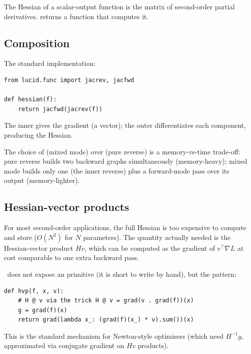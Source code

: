 The Hessian of a scalar-output function is the matrix of
second-order partial derivatives.  returns a
function that computes it.

\subsection{Composition}
\label{ssec:higher_order:hessian_composition}

The standard implementation:

\begin{lstlisting}[style=lucid,language=LucidPython]
from lucid.func import jacrev, jacfwd

def hessian(f):
    return jacfwd(jacrev(f))
\end{lstlisting}

The inner  gives the gradient (a vector); the outer
 differentiates each component, producing the
Hessian.

The choice of  (mixed mode) over
 (pure reverse) is a memory-vs-time
trade-off: pure reverse builds two backward graphs simultaneously
(memory-heavy); mixed mode builds only one (the inner reverse)
plus a forward-mode pass over its output (memory-lighter).

\subsection{Hessian-vector products}
\label{ssec:higher_order:hvp}

For most second-order applications, the full Hessian is too
expensive to compute and store ($O(N^2)$ for $N$ parameters). The
quantity actually needed is the Hessian-vector product
$H v$, which can be computed as the gradient of $v^\top \nabla L$
at cost comparable to one extra backward pass.

\Lucid\ does not expose an  primitive (it is short to
write by hand), but the pattern:

\begin{lstlisting}[style=lucid,language=LucidPython]
def hvp(f, x, v):
    # H @ v via the trick H @ v = grad(v . grad(f))(x)
    g = grad(f)(x)
    return grad(lambda x_: (grad(f)(x_) * v).sum())(x)
\end{lstlisting}

This is the standard mechanism for Newton-style optimisers (which
need $H^{-1} g$, approximated via conjugate gradient on $H v$
products).

